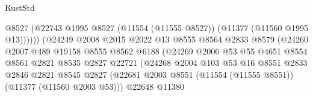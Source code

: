 \begin{lexlean}{RustStd}
\begin{coremodule}
                                            @8527
                                            (@22743
                                              @1995
                                              @8527
                                              (@11554 (@11555 @8527))
                                              (@11377 (@11560 @1995 @13))))))
                                      (@24249
                                        @2008
                                        @2015
                                        @2022
                                        @13
                                        @8555
                                        @8564
                                        @2833
                                        @8579
                                        (@24260
                                          @2007
                                          @489
                                          @19158
                                          @8555
                                          @8562
                                          @6188
                                          (@24269
                                            @2006
                                            @53
                                            @55
                                            @4651
                                            @8554
                                            @8561
                                            @2821
                                            @8535
                                            @2827
                                            @22721
                                            (@24268
                                              @2004
                                              @103
                                              @53
                                              @16
                                              @8551
                                              @2833
                                              @2846
                                              @2821
                                              @8545
                                              @2827
                                              (@22681
                                                @2003
                                                @8551
                                                (@11554 (@11555 @8551))
                                                (@11377 (@11560 @2003 @53)))
                                              @22648
                                              @11380

\end{coremodule}
\end{lexlean}
